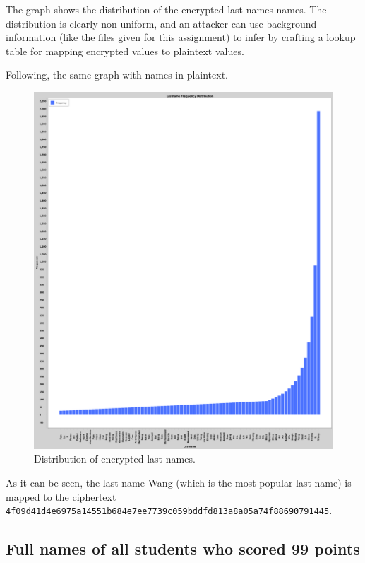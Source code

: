 The graph shows the distribution of the encrypted last names names. The distribution is clearly non-uniform, and an attacker can use background information (like the files given for this assignment) to infer by crafting a lookup table for mapping encrypted values to plaintext values.

Following, the same graph with names in plaintext.

\begin{figure}[h!]
    \centering
    \includegraphics[width=\textwidth]{03-ex2/Lastname_Frequency_Distribution_Plain.png}
    \caption{Distribution of encrypted last names.}
    \label{fig:Distribution-of-last-names-plain}
\end{figure}

As it can be seen, the last name Wang (which is the most popular last name) is mapped to the ciphertext \\ \texttt{4f09d41d4e6975a14551b684e7ee7739c059bddfd813a8a05a74f88690791445}.

\subsection{Full names of all students who scored 99 points}

